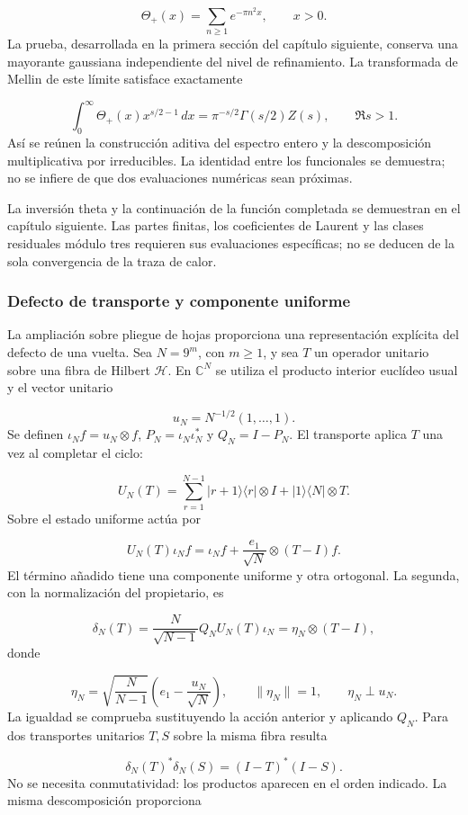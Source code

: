 \[
\Theta_+(x)=\sum_{n\ge1}e^{-\pi n^2x},\qquad x>0.
\]
La prueba, desarrollada en la primera sección del capítulo siguiente, conserva una mayorante gaussiana independiente del nivel de refinamiento. La transformada de Mellin de este límite satisface exactamente

\[
\int_0^\infty\Theta_+(x)x^{s/2-1}\,dx
=\pi^{-s/2}\Gamma(s/2)Z(s),\qquad \Re s>1.
\]
Así se reúnen la construcción aditiva del espectro entero y la descomposición multiplicativa por irreducibles. La identidad entre los funcionales se demuestra; no se infiere de que dos evaluaciones numéricas sean próximas.

La inversión theta y la continuación de la función completada se demuestran en el capítulo siguiente. Las partes finitas, los coeficientes de Laurent y las clases residuales módulo tres requieren sus evaluaciones específicas; no se deducen de la sola convergencia de la traza de calor.

\subsubsection*{Defecto de transporte y componente uniforme}
La ampliación sobre pliegue de hojas proporciona una representación explícita del defecto de una vuelta. Sea \(N=9^m\), con \(m\ge1\), y sea \(T\) un operador unitario sobre una fibra de Hilbert \(\mathcal H\). En \(\mathbb C^N\) se utiliza el producto interior euclídeo usual y el vector unitario

\[
u_N=N^{-1/2}(1,\ldots,1).
\]
Se definen \(\iota_Nf=u_N\otimes f\), \(P_N=\iota_N\iota_N^*\) y \(Q_N=I-P_N\). El transporte aplica \(T\) una vez al completar el ciclo:

\[
U_N(T)=\sum_{r=1}^{N-1}|r+1\rangle\langle r|\otimes I
+|1\rangle\langle N|\otimes T.
\]
Sobre el estado uniforme actúa por

\[
U_N(T)\iota_N f
=\iota_N f+\frac{e_1}{\sqrt N}\otimes(T-I)f.
\]
El término añadido tiene una componente uniforme y otra ortogonal. La segunda, con la normalización del propietario, es

\[
\delta_N(T)=\frac{N}{\sqrt{N-1}}Q_NU_N(T)\iota_N
=\eta_N\otimes(T-I),
\]
donde

\[
\eta_N=\sqrt{\frac N{N-1}}\left(e_1-\frac{u_N}{\sqrt N}\right),
\qquad \|\eta_N\|=1,\qquad \eta_N\perp u_N.
\]
La igualdad se comprueba sustituyendo la acción anterior y aplicando \(Q_N\). Para dos transportes unitarios \(T,S\) sobre la misma fibra resulta

\[
\delta_N(T)^*\delta_N(S)=(I-T)^*(I-S).
\]
No se necesita conmutatividad: los productos aparecen en el orden indicado. La misma descomposición proporciona

